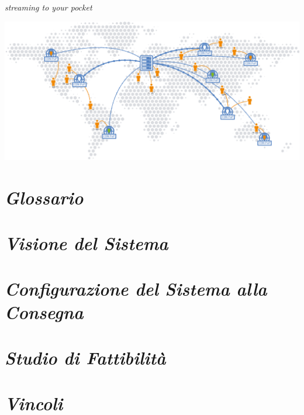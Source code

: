 \documentclass{article}
\author{Agosta, Belli, Emili, Giacchini, Luciani}
\begin{document}
\begin{center}
    \sffamily{\fontsize{50}{48} \selectfont \textcolor{red}{Nexi}\textcolor{green}{Fy}}
\end{center}

\begin{center}
    \itshape{\fontsize{20}{48} \selectfont streaming to your pocket}
\end{center}

\bigskip\bigskip\bigskip

\begin{flushleft}
    \includegraphics[scale=1]{images/worldCDN.png}
\end{flushleft}

\newpage
\printindex

\tableofcontents

\newpage
\section{\itshape{Glossario}}


\newpage
\section{\itshape{Visione del Sistema}}



\section{\itshape{Configurazione del Sistema alla Consegna}}


\section{\itshape{Studio di Fattibilità}}



\section{\itshape{Vincoli}}

\end{document}
